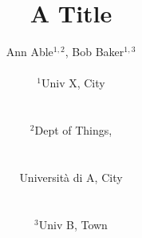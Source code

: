 \documentclass{article}
\title{A Title}
\author{Ann Able$^{1,2}$, Bob Baker$^{1,3}$
\\
\begin{small}
$^{1}$Univ X, City
 \end{small}
\\
\begin{small}
$^{2}$Dept of Things,
 \end{small}
 \\
 \begin{small}
Universit{\`a} di A, City
 \end{small}
\\
 \begin{small}
$^{3}$Univ B, Town
 \end{small}
\\
}

\maketitle
Text.

